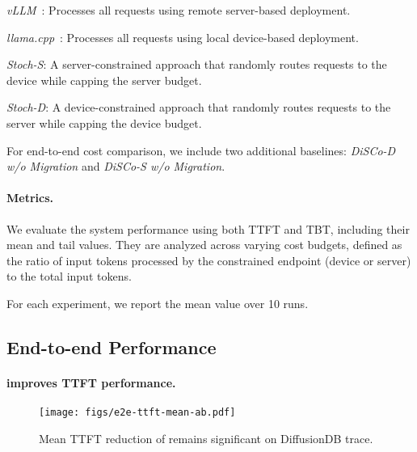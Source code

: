\begin{denseitemize}
    \item \emph{vLLM}~\cite{vllm}: Processes all requests using remote server-based deployment. 
    
    \item \emph{llama.cpp}~\cite{llama_cpp}: Processes all requests using local device-based deployment.
    
    \item \emph{Stoch-S}: A server-constrained approach that randomly routes requests to the device while capping the server budget.
    
    \item \emph{Stoch-D}: A device-constrained approach that randomly routes requests to the server while capping the device budget.
\end{denseitemize}

For end-to-end cost comparison, we include two additional baselines: \emph{DiSCo-D w/o Migration} and \emph{DiSCo-S w/o Migration}.

\paragraph{Metrics.} 
We evaluate the system performance using both TTFT and TBT, including their mean and tail values. They are analyzed across varying cost budgets, defined as the ratio of input tokens processed by the constrained endpoint (device or server) to the total input tokens. 

For each experiment, we report the mean value over 10 runs. 

\subsection{End-to-end Performance}

\paragraph{\disco{} improves TTFT performance.} 

\begin{figure}[t]
    \centering
    \texttt{[image: figs/e2e-ttft-mean-ab.pdf]}
    \vskip -0.1in
    \caption{Mean TTFT reduction of \disco{} remains significant on DiffusionDB trace.}
    \vskip -0.1in
    \label{fig:e2e-ttft-diffusiondb}
\end{figure}

